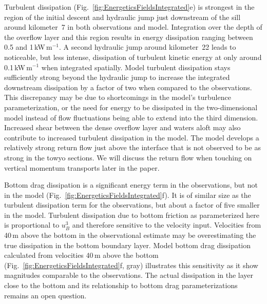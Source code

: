 \documentclass{ametsocV6.1}
\begin{document}
Turbulent dissipation (Fig.~\ref{fig:EnergeticsFieldsIntegrated}e) is strongest in the region of the initial descent and hydraulic jump just downstream of the sill around kilometer~7 in both observations and model.
Integration over the depth of the overflow layer and this region results in energy dissipation ranging between 0.5 and 1\,kW\,m$^{-1}$.
A second hydraulic jump around kilometer~22 leads to noticeable, but less intense, dissipation of turbulent kinetic energy at only around 0.1\,kW\,m$^{-1}$ when integrated spatially.
Model turbulent dissipation stays sufficiently strong beyond the hydraulic jump to increase the integrated downstream dissipation by a factor of two when compared to the observations.
This discrepancy may be due to shortcomings in the model's turbulence parameterization, or the need for energy to be dissipated in the two-dimensional model instead of flow fluctuations being able to extend into the third dimension.
Increased shear between the dense overflow layer and waters aloft may also contribute to increased turbulent dissipation in the model.
The model develops a relatively strong return flow just above the interface that is not observed to be as strong in the towyo sections.
We will discuss the return flow when touching on vertical momentum transports later in the paper.

Bottom drag dissipation is a significant energy term in the observations, but not in the model (Fig.~\ref{fig:EnergeticsFieldsIntegrated}f).
It is of similar size as the turbulent dissipation term for the observations, but about a factor of five smaller in the model.
Turbulent dissipation due to bottom friction as parameterized here is proportional to $u_B^3$ and therefore sensitive to the velocity input.
Velocities from 40\,m above the bottom in the observational estimate may be overestimating the true dissipation in the bottom boundary layer.
Model bottom drag dissipation calculated from velocities 40\,m above the bottom (Fig.~\ref{fig:EnergeticsFieldsIntegrated}f, gray) illustrates this sensitivity as it show magnitudes comparable to the observations.
The actual dissipation in the layer close to the bottom and its relationship to bottom drag parameterizations remains an open question.
\end{document}
